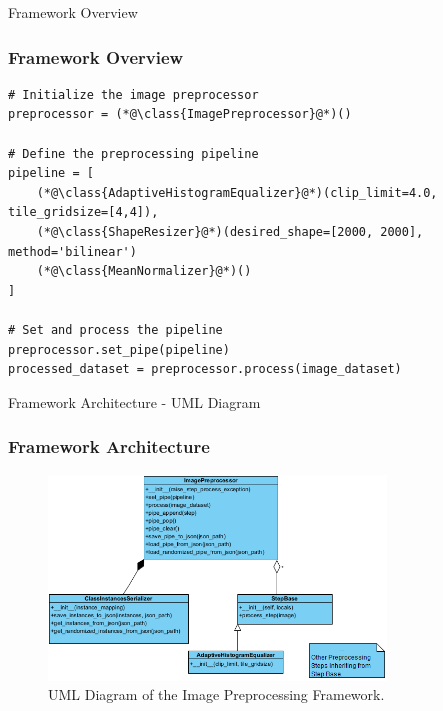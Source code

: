 % 

\begin{frame}[fragile]{Framework Overview}
    \frametitle{Framework Overview}

    \begin{lstlisting}[caption={Example Usage of the Image Preprocessing Framework.}, label=lst:frameworkusage, basicstyle=\scriptsize\ttfamily]
# Initialize the image preprocessor
preprocessor = (*@\class{ImagePreprocessor}@*)()

# Define the preprocessing pipeline
pipeline = [
    (*@\class{AdaptiveHistogramEqualizer}@*)(clip_limit=4.0, tile_gridsize=[4,4]),
    (*@\class{ShapeResizer}@*)(desired_shape=[2000, 2000], method='bilinear')
    (*@\class{MeanNormalizer}@*)()
]

# Set and process the pipeline
preprocessor.set_pipe(pipeline)
processed_dataset = preprocessor.process(image_dataset)
    \end{lstlisting}
\end{frame}

\begin{frame}{Framework Architecture - UML Diagram}
    \frametitle{Framework Architecture}
    \begin{figure}
        \center
        \includegraphics[width=0.8\textwidth]{figures/image_preprocessing_uml.png}
        \caption{UML Diagram of the Image Preprocessing Framework.}
        \label{fig:uml_diagram}
    \end{figure}
\end{frame}

